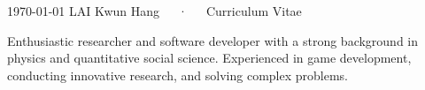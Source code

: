 \documentclass[11pt, a4paper]{awesome-cv}
\begin{document}
\makecvheader

\makecvfooter
  {\today}
  {LAI Kwun Hang~~~·~~~Curriculum Vitae}
  {\thepage}

\vspace{1em}
Enthusiastic researcher and software developer with a strong background in physics and quantitative social science. Experienced in game development, conducting innovative research, and solving complex problems.







%

%
%
%
%


\end{document}
